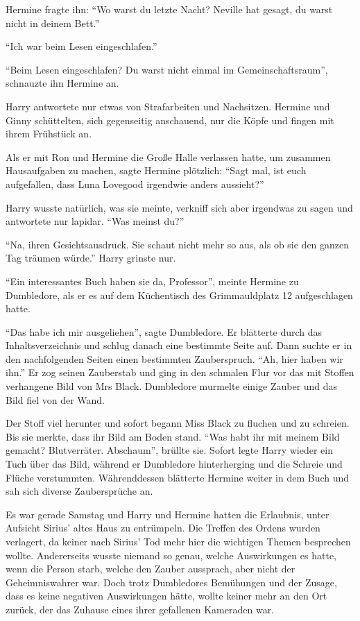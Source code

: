 Hermine fragte ihn: \enquote{Wo warst du letzte Nacht? Neville hat gesagt, du warst nicht in deinem Bett.}

\enquote{Ich war beim Lesen eingeschlafen.}

\enquote{Beim Lesen eingeschlafen? Du warst nicht einmal im Gemeinschaftsraum}, schnauzte ihn Hermine an.

Harry antwortete nur etwas von Strafarbeiten und Nachsitzen. Hermine und Ginny schüttelten, sich gegenseitig anschauend, nur die Köpfe und fingen mit ihrem Frühstück an.

Als er mit Ron und Hermine die Große Halle verlassen hatte, um zusammen Hausaufgaben zu machen, sagte Hermine plötzlich: \enquote{Sagt mal, ist euch aufgefallen, dass Luna Lovegood irgendwie anders aussieht?}

Harry wusste natürlich, was sie meinte, verkniff sich aber irgendwas zu sagen und antwortete nur lapidar. \enquote{Was meinst du?}

\enquote{Na, ihren Gesichtsausdruck. Sie schaut nicht mehr so aus, als ob sie den ganzen Tag träumen würde.}
Harry grinste nur.

\trenn

\enquote{Ein interessantes Buch haben sie da, Professor}, meinte Hermine zu Dumbledore, als er es auf dem Küchentisch des Grimmauldplatz 12 aufgeschlagen hatte.

\enquote{Das habe ich mir ausgeliehen}, sagte Dumbledore. Er blätterte durch das Inhaltsverzeichnis und schlug danach eine bestimmte Seite auf. Dann suchte er in den nachfolgenden Seiten einen bestimmten Zauberspruch. \enquote{Ah, hier haben wir ihn.} Er zog seinen Zauberstab und ging in den schmalen Flur vor das mit Stoffen verhangene Bild von Mrs Black. Dumbledore murmelte einige Zauber und das Bild fiel von der Wand.

Der Stoff viel herunter und sofort begann Miss Black zu fluchen und zu schreien. Bis sie merkte, dass ihr Bild am Boden stand. \enquote{Was habt ihr mit meinem Bild gemacht? Blutverräter. Abschaum}, brüllte sie. Sofort legte Harry wieder ein Tuch über das Bild, während er Dumbledore hinterherging und die Schreie und Flüche verstummten. Währenddessen blätterte Hermine weiter in dem Buch und sah sich diverse Zaubersprüche an.

Es war gerade Samstag und Harry und Hermine hatten die Erlaubnis, unter Aufsicht Sirius' altes Haus zu entrümpeln. Die Treffen des Ordens wurden verlagert, da keiner nach Sirius’ Tod mehr hier die wichtigen Themen besprechen wollte. Andererseits wusste niemand so genau, welche Auswirkungen es hatte, wenn die Person starb, welche den Zauber aussprach, aber nicht der Geheimniswahrer war. Doch trotz Dumbledores Bemühungen und der Zusage, dass es keine negativen Auswirkungen hätte, wollte keiner mehr an den Ort zurück, der das Zuhause eines ihrer gefallenen Kameraden war.

